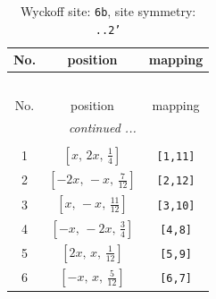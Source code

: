 \documentclass[fleqn,8pt]{jsarticle}
\begin{document}
\begin{longtable}{ccc}
\caption{Wyckoff site: {\tt 6b}, site symmetry: {\tt ..2'}}
 \\
 \hline \hline
No. & position & mapping \\ \hline \endfirsthead

\multicolumn{2}{l}{\tablename\ \thetable{}} \\
 \hline \hline
No. & position & mapping \\ \hline \endhead

 \hline \hline
\multicolumn{2}{r}{\footnotesize\it continued ...} \\ \endfoot

 \hline \hline
\multicolumn{2}{r}{} \\ \endlastfoot

1 & $\left[ x,\, 2 x,\, \frac{1}{4} \right]$ & {\tt [1,11]} \\ \hline
2 & $\left[ - 2 x,\, - x,\, \frac{7}{12} \right]$ & {\tt [2,12]} \\ \hline
3 & $\left[ x,\, - x,\, \frac{11}{12} \right]$ & {\tt [3,10]} \\ \hline
4 & $\left[ - x,\, - 2 x,\, \frac{3}{4} \right]$ & {\tt [4,8]} \\ \hline
5 & $\left[ 2 x,\, x,\, \frac{1}{12} \right]$ & {\tt [5,9]} \\ \hline
6 & $\left[ - x,\, x,\, \frac{5}{12} \right]$ & {\tt [6,7]} \\
\end{longtable}
\renewcommand{\arraystretch}{1.2}
\end{document}
